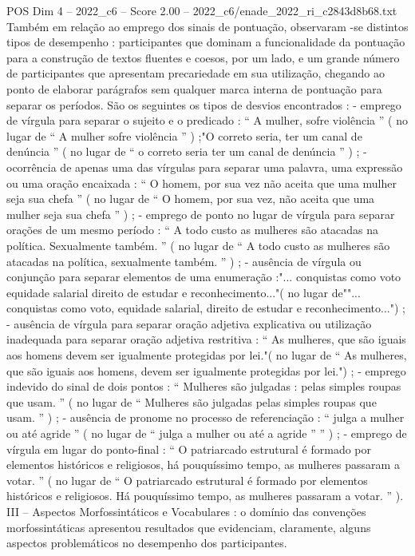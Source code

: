 \begin{textsample}{POS Dim 4 – 2022\_c6 – Score 2.00 – 2022\_c6/enade\_2022\_ri\_c2843d8b68.txt}
Também em relação ao emprego dos sinais de pontuação, observaram -se distintos tipos de desempenho : participantes que dominam a funcionalidade da pontuação para a construção de textos fluentes e coesos, por um lado, e um grande número de participantes que apresentam precariedade em sua utilização, chegando ao ponto de elaborar parágrafos sem qualquer marca interna de pontuação para separar os períodos.
São os seguintes os tipos de desvios encontrados : - emprego de vírgula para separar o sujeito e o predicado : “ A mulher, sofre violência ” ( no lugar de “ A mulher sofre violência ” ) ;"O correto seria, ter um canal de denúncia ” ( no lugar de “ o correto seria ter um canal de denúncia ” ) ; - ocorrência de apenas uma das vírgulas para separar uma palavra, uma expressão ou uma oração encaixada : “ O homem, por sua vez não aceita que uma mulher seja sua chefa ” ( no lugar de “ O homem, por sua vez, não aceita que uma mulher seja sua chefa ” ) ; - emprego de ponto no lugar de vírgula para separar orações de um mesmo período : “ A todo custo as mulheres são atacadas na política.
Sexualmente também. ” ( no lugar de “ A todo custo as mulheres são atacadas na política, sexualmente também. ” ) ; - ausência de vírgula ou conjunção para separar elementos de uma enumeração :"... conquistas como voto equidade salarial direito de estudar e reconhecimento..."( no lugar de""... conquistas como voto, equidade salarial, direito de estudar e reconhecimento...") ; - ausência de vírgula para separar oração adjetiva explicativa ou utilização inadequada para separar oração adjetiva restritiva : “ As mulheres, que são iguais aos homens devem ser igualmente protegidas por lei."( no lugar de “ As mulheres, que são iguais aos homens, devem ser igualmente protegidas por lei.") ; - emprego indevido do sinal de dois pontos : “ Mulheres são julgadas : pelas simples roupas que usam. ” ( no lugar de “ Mulheres são julgadas pelas simples roupas que usam. ” ) ; - ausência de pronome no processo de referenciação : “ julga a mulher ou até agride ” ( no lugar de “ julga a mulher ou até a agride ” ” ) ; - emprego de vírgula em lugar do ponto-final : “ O patriarcado estrutural é formado por elementos históricos e religiosos, há pouquíssimo tempo, as mulheres passaram a votar. ” ( no lugar de “ O patriarcado estrutural é formado por elementos históricos e religiosos.
Há pouquíssimo tempo, as mulheres passaram a votar. ” ).
III – Aspectos Morfossintáticos e Vocabulares : o domínio das convenções morfossintáticas apresentou resultados que evidenciam, claramente, alguns aspectos problemáticos no desempenho dos participantes.

\end{textsample}
